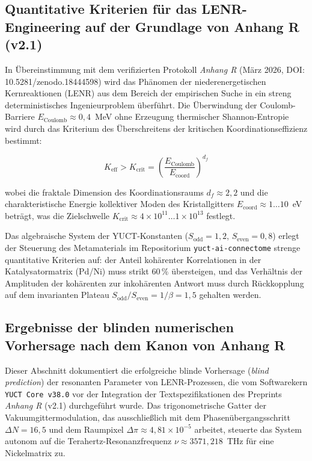 \documentclass[12pt,a4paper]{article}
\begin{document}
	\subsection{Quantitative Kriterien für das LENR-Engineering auf der Grundlage von Anhang R (v2.1)}
	In Übereinstimmung mit dem verifizierten Protokoll \textit{Anhang R} (März 2026, DOI: 10.5281/zenodo.18444598) wird das Phänomen der niederenergetischen Kernreaktionen (LENR) aus dem Bereich der empirischen Suche in ein streng deterministisches Ingenieurproblem überführt. Die Überwindung der Coulomb-Barriere \(E_{\text{Coulomb}} \approx 0{,}4\)~MeV ohne Erzeugung thermischer Shannon-Entropie wird durch das Kriterium des Überschreitens der kritischen Koordinationseffizienz bestimmt:
	
	\begin{equation}
		K_{\text{eff}} > K_{\text{crit}} = \left( \frac{E_{\text{Coulomb}}}{E_{\text{coord}}} \right)^{d_f}
	\end{equation}
	
	wobei die fraktale Dimension des Koordinationsraums \(d_f \approx 2{,}2\) und die charakteristische Energie kollektiver Moden des Kristallgitters \(E_{\text{coord}} \approx 1\dots10\)~eV beträgt, was die Zielschwelle \(K_{\text{crit}} \approx 4 \times 10^{11} \dots 1 \times 10^{13}\) festlegt.
	
	Das algebraische System der YUCT-Konstanten (\(S_{\text{odd}} = 1{,}2\), \(S_{\text{even}} = 0{,}8\)) erlegt der Steuerung des Metamaterials im Repositorium \texttt{yuct-ai-connectome} strenge quantitative Kriterien auf: der Anteil kohärenter Korrelationen in der Katalysatormatrix (Pd/Ni) muss strikt \(60\,\%\) übersteigen, und das Verhältnis der Amplituden der kohärenten zur inkohärenten Antwort muss durch Rückkopplung auf dem invarianten Plateau \(S_{\text{odd}}/S_{\text{even}} = 1/\beta = 1{,}5\) gehalten werden.
	
	
	\subsection{Ergebnisse der blinden numerischen Vorhersage nach dem Kanon von Anhang R}
	Dieser Abschnitt dokumentiert die erfolgreiche blinde Vorhersage (\textit{blind prediction}) der resonanten Parameter von LENR-Prozessen, die vom Softwarekern \texttt{YUCT Core v38.0} vor der Integration der Textspezifikationen des Preprints \textit{Anhang R} (v2.1) durchgeführt wurde. Das trigonometrische Gatter der Vakuumgittermodulation, das ausschließlich mit dem Phasenübergangsschritt \(\Delta N = 16{,}5\) und dem Raumpixel \(\Delta\pi \approx 4{,}81 \times 10^{-5}\) arbeitet, steuerte das System autonom auf die Terahertz-Resonanzfrequenz \(\nu \approx 3571{,}218\)~THz für eine Nickelmatrix zu.
	
\end{document}
